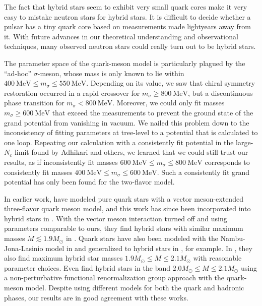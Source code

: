 The fact that hybrid stars seem to exhibit very small quark cores
make it very easy to mistake neutron stars for hybrid stars.
It is difficult to decide whether a pulsar has a tiny quark core based on measurements made lightyears away from it.
With future advances in our theoretical understanding and observational techniques,
many observed neutron stars could really turn out to be hybrid stars.

The parameter space of the quark-meson model is particularly plagued by the ``ad-hoc'' $\sigma$-meson,
whose mass is only known to lie within $\SI{400}{\mega\electronvolt} \leq m_\sigma \leq \SI{550}{\mega\electronvolt}$.
Depending on its value, we saw that chiral symmetry restoration occurred in a rapid crossover for $m_\sigma \geq \SI{800}{\mega\electronvolt}$,
but a discontinuous phase transition for $m_\sigma < \SI{800}{\mega\electronvolt}$.
Moreover, we could only fit masses $m_\sigma \geq \SI{600}{\mega\electronvolt}$ that exceed the measurements
to prevent the ground state of the grand potential from vanishing in vacuum.
We nailed this problem down to the inconsistency of fitting parameters at tree-level to a potential that is calculated to one loop.
Repeating our calculation with a consistently fit potential in the large-$N_c$ limit found by Adhikari and others,
we learned that we could still trust our results,
as if inconsistently fit masses $\SI{600}{\mega\electronvolt} \leq m_\sigma \leq \SI{800}{\mega\electronvolt}$
corresponds to consistently fit masses $\SI{400}{\mega\electronvolt} \leq m_\sigma \leq \SI{600}{\mega\electronvolt}$.
Such a consistently fit grand potential has only been found for the two-flavor model.

In earlier work, \cite{ref:lsm3f_compact_stars} have modeled pure quark stars with a vector meson-extended three-flavor quark meson model,
and this work has since been incorporated into hybrid stars in \cite{ref:lsm3f_hybrid_stars}.
With the vector meson interaction turned off and using parameters comparable to ours,
they find hybrid stars with similar maximum masses $M \lesssim 1.9 M_\odot$ in \cite[figure 8]{ref:lsm3f_hybrid_stars}. %
Quark stars have also been modeled with the Nambu-Jona-Lasinio model in \cite{ref:quark_star_njl} and generalized to hybrid stars in \cite{ref:hybrid_stars_njl}, for example.
In \cite[figure 3]{ref:hybrid_stars_njl}, they also find maximum hybrid star masses $1.9 M_\odot \leq M \leq 2.1 M_\odot$ with reasonable parameter choices.
Even \cite{ref:quark_hybrid_additional_ref} find hybrid stars in the band $2.0 M_\odot \leq M \leq 2.1 M_\odot$
using a non-perturbative functional renormalization group approach with the quark-meson model.
Despite using different models for both the quark and hadronic phases,
our results are in good agreement with these works.

